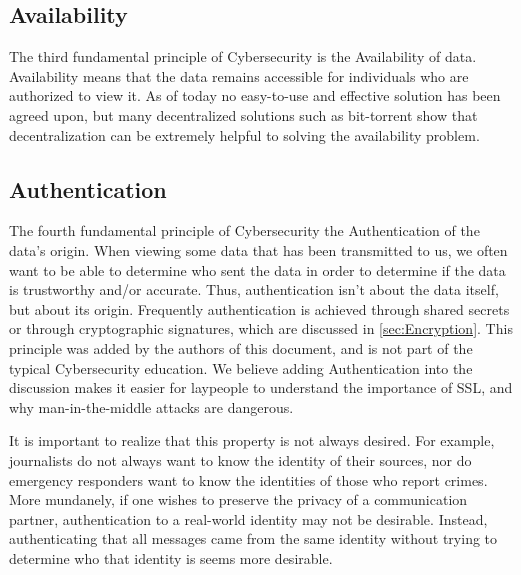 \subsection{Availability}

The third fundamental principle of Cybersecurity is the Availability of data. Availability means that the data remains accessible for individuals who are authorized to view it. As of today no easy-to-use and effective solution has been agreed upon, but many decentralized solutions such as bit-torrent show that decentralization can be extremely helpful to solving the availability problem.

\subsection{Authentication}

The fourth fundamental principle of Cybersecurity the Authentication of the data's origin. When viewing some data that has been transmitted to us, we often want to be able to determine who sent the data in order to determine if the data is trustworthy and/or accurate. Thus, authentication isn't about the data itself, but about its origin. Frequently authentication is achieved through shared secrets or through cryptographic signatures, which are discussed in \ref{sec:Encryption}. This principle was added by the authors of this document, and is not part of the typical Cybersecurity education. We believe adding Authentication into the discussion makes it easier for laypeople to understand the importance of SSL, and why man-in-the-middle attacks are dangerous.

It is important to realize that this property is not always desired. For example, journalists do not always want to know the identity of their sources, nor do emergency responders want to know the identities of those who report crimes. More mundanely, if one wishes to preserve the privacy of a communication partner, authentication to a real-world identity may not be desirable. Instead, authenticating that all messages came from the same identity without trying to determine who that identity is seems more desirable. 
